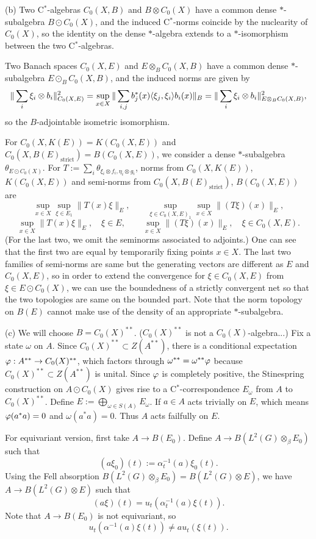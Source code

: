 \documentclass{../../large}
\begin{document}
\begin{pf}

(b)
Two C$^*$-algebras $C_0(X,B)$ and $B\otimes C_0(X)$ have a common dense $*$-subalgebra $B\odot C_0(X)$, and the induced C$^*$-norms coincide by the nuclearity of $C_0(X)$, so the identity on the dense $*$-algebra extends to a $*$-isomorphism between the two C$^*$-algebras.

Two Banach spaces $C_0(X,E)$ and $E\otimes_BC_0(X,B)$ have a common dense $*$-subalgebra $E\odot_BC_0(X,B)$, and the induced norms are given by
\[\|\sum_i\xi_i\otimes b_i\|^2_{C_0(X,E)}=\sup_{x\in X}\|\sum_{i,j}b_j^*(x)\langle\xi_j,\xi_i\rangle b_i(x)\|_B=\|\sum_i\xi_i\otimes b_i\|^2_{E\otimes_BC_0(X,B)},\]
so the $B$-adjointable isometric isomorphism.

For $C_0(X,K(E))=K(C_0(X,E))$ and $C_0(X,B(E)_{\mathrm{strict}})=B(C_0(X,E))$, we consider a dense $*$-subalgebra $\theta_{E\odot C_0(X)}$.
For $T:=\sum_i\theta_{\xi_i\otimes f_i,\eta_i\otimes g_i}$, norms from $C_0(X,K(E))$, $K(C_0(X,E))$ and semi-norms from $C_0(X,B(E)_{\mathrm{strict}})$, $B(C_0(X,E))$ are
\[\sup_{x\in X}\sup_{\xi\in E_1}\|T(x)\xi\|_E,\qquad\sup_{\xi\in C_0(X,E)_1}\sup_{x\in X}\|(T\xi)(x)\|_E,\]
\[\sup_{x\in X}\|T(x)\xi\|_E,\quad\xi\in E,\qquad
\sup_{x\in X}\|(T\xi)(x)\|_E,\quad\xi\in C_0(X,E).\]
(For the last two, we omit the seminorms associated to adjoints.)
One can see that the first two are equal by temporarily fixing points $x\in X$.
The last two families of semi-norms are same but the generating vectors are different as $E$ and $C_0(X,E)$, so in order to extend the convergence for $\xi\in C_0(X,E)$ from $\xi\in E\odot C_0(X)$, we can use the boundedness of a strictly convergent net so that the two topologies are same on the bounded part.
Note that the norm topology on $B(E)$ cannot make use of the density of an appropriate $*$-subalgebra.


(c)
We will choose $B=C_0(X)^{**}$. ($C_0(X)^{**}$ is not a $C_0(X)$-algebra...)
Fix a state $\omega$ on $A$.
Since $C_0(X)^{**}\subset Z(A^{**})$, there is a conditional expectation $\varphi:A^{**}\to C_0(X)^{**}$, which factors through $\omega^{**}=\omega^{**}\varphi$ because $C_0(X)^{**}\subset Z(A^{**})$ is unital.
Since $\varphi$ is completely positive, the Stinespring construction on $A\odot C_0(X)$ gives rise to a C$^*$-correspondence $E_\omega$ from $A$ to $C_0(X)^{**}$.
Define $E:=\bigoplus_{\omega\in S(A)}E_\omega$.
If $a\in A$ acts trivially on $E$, which means $\varphi(a^*a)=0$ and $\omega(a^*a)=0$.
Thus $A$ acts failfully on $E$.

For equivariant version, first take $A\to B(E_0)$.
Define $A\to B(L^2(G)\otimes_\beta E_0)$ such that
\[(a\xi_0)(t):=\alpha_t^{-1}(a)\xi_0(t).\]
Using the Fell absorption $B(L^2(G)\otimes_\beta E_0)=B(L^2(G)\otimes E)$, we have $A\to B(L^2(G)\otimes E)$ such that
\[(a\xi)(t)=u_t(\alpha_t^{-1}(a)\xi(t)).\]
Note that $A\to B(E_0)$ is not equivariant, so
\[u_t(\alpha^{-1}(a)\xi(t))\ne au_t(\xi(t)).\]

\end{pf}
\end{document}
